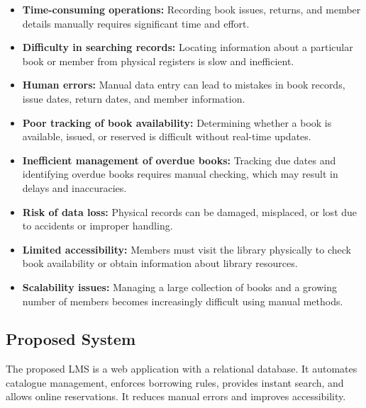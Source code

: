 \begin{itemize}[leftmargin=*]
\item \textbf{Time-consuming operations:} Recording book issues, returns, and member details manually requires significant time and effort.

\item \textbf{Difficulty in searching records:} Locating information about a particular book or member from physical registers is slow and inefficient.

\item \textbf{Human errors:} Manual data entry can lead to mistakes in book records, issue dates, return dates, and member information.

\item \textbf{Poor tracking of book availability:} Determining whether a book is available, issued, or reserved is difficult without real-time updates.

\item \textbf{Inefficient management of overdue books:} Tracking due dates and identifying overdue books requires manual checking, which may result in delays and inaccuracies.

\item \textbf{Risk of data loss:} Physical records can be damaged, misplaced, or lost due to accidents or improper handling.

\item \textbf{Limited accessibility:} Members must visit the library physically to check book availability or obtain information about library resources.

\item \textbf{Scalability issues:} Managing a large collection of books and a growing number of members becomes increasingly difficult using manual methods.

\end{itemize}

\subsection{Proposed System}
The proposed LMS is a web application with a relational database. It automates catalogue management, enforces borrowing rules, provides instant search, and allows online reservations. It reduces manual errors and improves accessibility.

